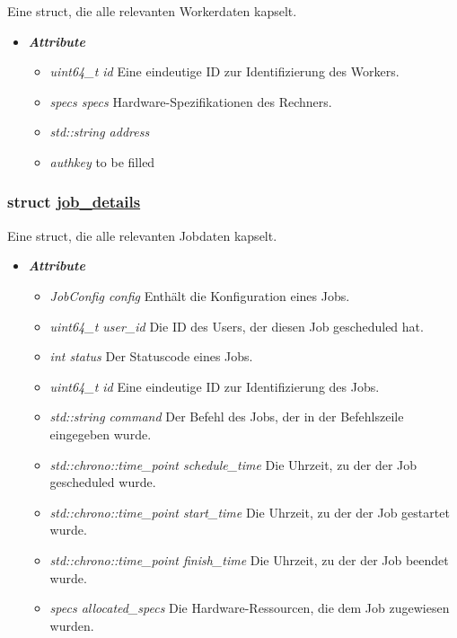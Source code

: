 \documentclass[a4paper,12pt]{article}
\newcommand\purl[1]{\protect\url{#1}}
\begin{document}
Eine struct, die alle relevanten Workerdaten kapselt.


\begin{itemize}[label={}]

	\item \textit{\textbf{Attribute}}
		\begin{itemize}[label={\textbullet}]
			\item \textit{uint64\_t id} Eine eindeutige ID zur Identifizierung des Workers.
			
			\item \textit{specs specs} Hardware-Spezifikationen des Rechners.
			
			\item \textit{std::string address}
			
			\item \textit{authkey} to be filled
		\end{itemize}


\end{itemize}
\clearpage

\subsubsection{struct \purl{job_details}}

Eine struct, die alle relevanten Jobdaten kapselt.

\begin{itemize}[label={}]

	\item \textit{\textbf{Attribute}}
		\begin{itemize}[label={\textbullet}]
			\item \textit{JobConfig config} Enthält die Konfiguration eines Jobs.
			
			\item \textit{uint64\_t user\_id} Die ID des Users, der diesen Job gescheduled hat.
			
			\item \textit{int status} Der Statuscode eines Jobs.
			
			\item \textit{uint64\_t id} Eine eindeutige ID zur Identifizierung des Jobs.
			
			\item \textit{std::string command} Der Befehl des Jobs, der in der Befehlszeile eingegeben wurde.
			
			\item \textit{std::chrono::time\_point schedule\_time} Die Uhrzeit, zu der der Job gescheduled wurde.
			
			\item \textit{std::chrono::time\_point start\_time} Die Uhrzeit, zu der der Job gestartet wurde.
			
			\item \textit{std::chrono::time\_point finish\_time} Die Uhrzeit, zu der der Job beendet wurde.
			
			\item \textit{specs allocated\_specs} Die Hardware-Ressourcen, die dem Job zugewiesen wurden.

		\end{itemize}


\end{itemize}
\clearpage
\end{document}

